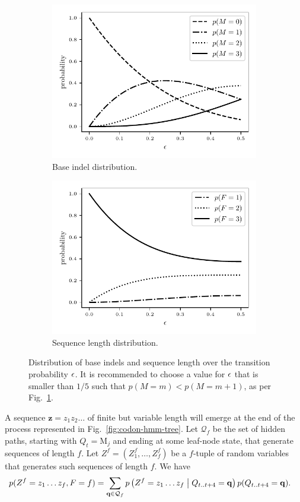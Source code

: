 \begin{figure}[htbp]
\centering
\begin{subfigure}{.5\textwidth}
  \centering
  \includegraphics[width=.7\linewidth]{figure/indel-prob}
  \caption{Base indel distribution.}%
  \label{fig:indel-dist}
\end{subfigure}%
\begin{subfigure}{.5\textwidth}
  \centering
  \includegraphics[width=.7\linewidth]{figure/seq-len-prob}
  \caption{Sequence length distribution.}%
  \label{fig:len-dist}
\end{subfigure}
\caption{
    Distribution of base indels and sequence length over the transition probability $\epsilon$.
    It is recommended to choose a value for $\epsilon$ that is smaller than $1/5$ such that
    $p(M=m)<p(M=m+1)$, as per Fig.~\ref{fig:indel-dist}.
}
\label{fig:dist}
\end{figure}

A sequence $\mathbf z=z_1 z_2\dots$ of finite but variable length will emerge at the end of the
process represented in Fig.~\ref{fig:codon-hmm-tree}.
Let $\mathcal Q_f$ be the set of hidden paths, starting with $Q_t=\mathrm M_j$ and ending at some leaf-node state,
that generate sequences of length $f$.
Let $Z^f=(Z^f_1, \dots, Z^f_f)$ be a $f$-tuple of random variables that generates such sequences of length $f$.
We have
\begin{align*}
    p(Z^f=z_1\dots z_f,F=f) &= \sum_{\mathbf q \in \mathcal Q_f}
    p\left(Z^f=z_1\dots z_f\;\middle|\; Q_{t..t+4}=\mathbf q\right) p(Q_{t..t+4}=\mathbf q).
\end{align*}
